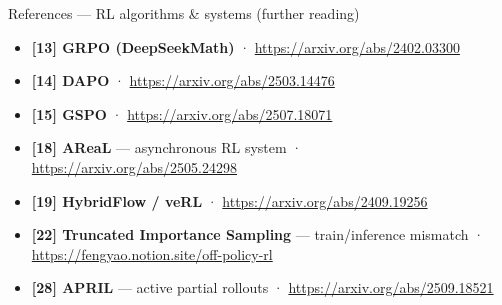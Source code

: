 \documentclass[
  10pt,
  ignorenonframetext,
  aspectratio=169,
  t]{beamer}
\providecommand{\tightlist}{%
  \setlength{\itemsep}{0pt}\setlength{\parskip}{0pt}}
\begin{document}
\begin{frame}[allowframebreaks]{References --- RL algorithms \& systems (further reading)}
\protect\hypertarget{references-rl-algorithms-systems-further-reading}{}
\begin{itemize}
\tightlist
\item
  \textbf{{[}13{]} GRPO (DeepSeekMath)} ·
  \url{https://arxiv.org/abs/2402.03300}
\item
  \textbf{{[}14{]} DAPO} · \url{https://arxiv.org/abs/2503.14476}
\item
  \textbf{{[}15{]} GSPO} · \url{https://arxiv.org/abs/2507.18071}
\item
  \textbf{{[}18{]} AReaL} --- asynchronous RL system ·
  \url{https://arxiv.org/abs/2505.24298}
\item
  \textbf{{[}19{]} HybridFlow / veRL} ·
  \url{https://arxiv.org/abs/2409.19256}
\item
  \textbf{{[}22{]} Truncated Importance Sampling} --- train/inference
  mismatch · \url{https://fengyao.notion.site/off-policy-rl}
\item
  \textbf{{[}28{]} APRIL} --- active partial rollouts ·
  \url{https://arxiv.org/abs/2509.18521}
\end{itemize}
\end{frame}
\end{document}
